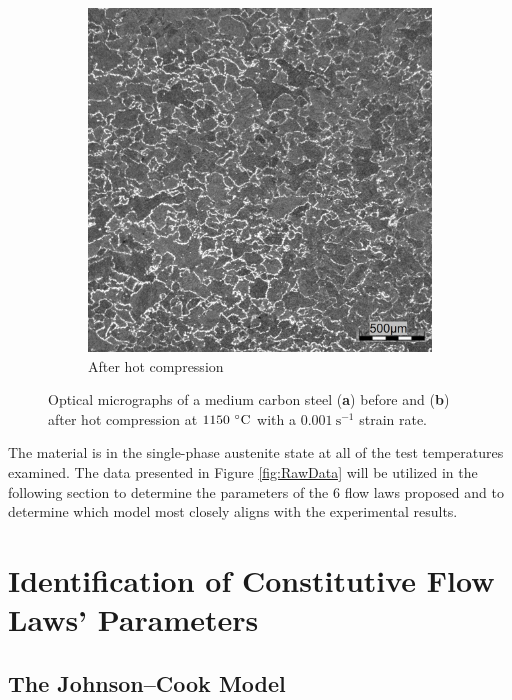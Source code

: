 \documentclass[metals,article,accept,pdftex,moreauthors]{Definitions/mdpi}
\DeclareRobustCommand{\ps}{\text{s}^{-1}}
\begin{document}
\begin{figure}[H]
\begin{subfigure}[b]{0.44\columnwidth}
\includegraphics[width=\columnwidth]{Figures/AfterCompM}
\caption{\centering After hot compression}
\end{subfigure}
\vspace{6pt}
\caption{Optical micrographs of a medium carbon steel (\textbf{a}) before and (\textbf{b}) after hot compression at $1150~\celsius$ with a $0.001~\ps$ strain rate.}
\label{fig:Micrography}
\end{figure}
The material is in the single-phase austenite state at all of the test temperatures examined.
The data presented in Figure \ref{fig:RawData} will be utilized in the following section to determine the parameters of the $6$ flow laws proposed and to determine which model most closely aligns with the experimental results.

\section{Identification of Constitutive Flow Laws' Parameters\label{sec:ConstLaws}}
\subsection{The Johnson--Cook Model\label{sec:JC}}
\end{document}
